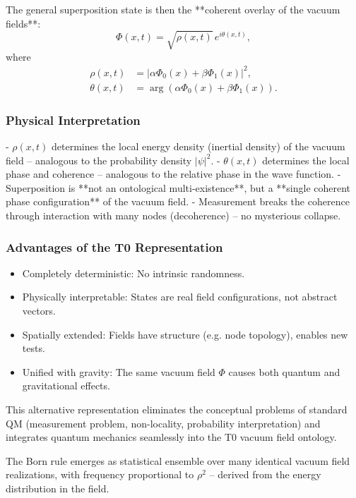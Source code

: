 \documentclass[12pt,a4paper]{article}
\begin{document}
	The general superposition state is then the **coherent overlay of the vacuum fields**:
	\[
	\Phi(x,t) = \sqrt{\rho(x,t)} \, e^{i \theta(x,t)},
	\]
	where
	\begin{align}
		\rho(x,t) &= |\alpha \Phi_0(x) + \beta \Phi_1(x)|^2, \\
		\theta(x,t) &= \arg(\alpha \Phi_0(x) + \beta \Phi_1(x)).
	\end{align}
	
	\subsubsection{Physical Interpretation}
	
	- $\rho(x,t)$ determines the local energy density (inertial density) of the vacuum field – analogous to the probability density $|\psi|^2$.
	- $\theta(x,t)$ determines the local phase and coherence – analogous to the relative phase in the wave function.
	- Superposition is **not an ontological multi-existence**, but a **single coherent phase configuration** of the vacuum field.
	- Measurement breaks the coherence through interaction with many nodes (decoherence) – no mysterious collapse.
	
	\subsubsection{Advantages of the T0 Representation}
	
	\begin{itemize}
		\item Completely deterministic: No intrinsic randomness.
		\item Physically interpretable: States are real field configurations, not abstract vectors.
		\item Spatially extended: Fields have structure (e.g. node topology), enables new tests.
		\item Unified with gravity: The same vacuum field $\Phi$ causes both quantum and gravitational effects.
	\end{itemize}
	
	This alternative representation eliminates the conceptual problems of standard QM (measurement problem, non-locality, probability interpretation) and integrates quantum mechanics seamlessly into the T0 vacuum field ontology.
	
	The Born rule emerges as statistical ensemble over many identical vacuum field realizations, with frequency proportional to $\rho^2$ – derived from the energy distribution in the field.
	
\end{document}
